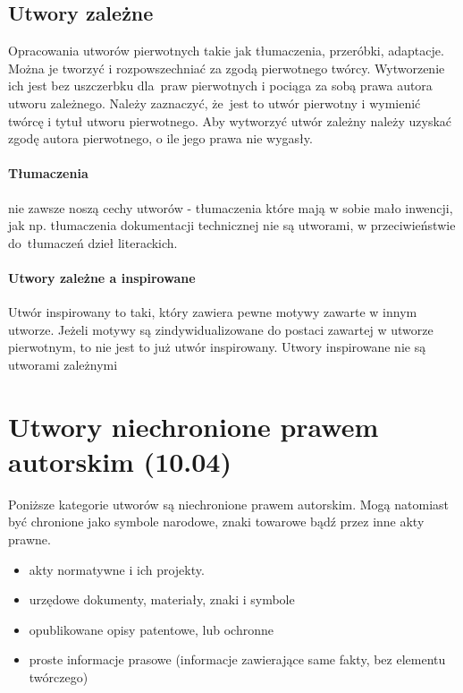 \documentclass{article}
\begin{document}
\subsection{Utwory zależne}

Opracowania utworów pierwotnych takie jak tłumaczenia, przeróbki, adaptacje.
Można je tworzyć i rozpowszechniać za zgodą pierwotnego twórcy.
Wytworzenie ich jest bez uszczerbku dla~praw pierwotnych i pociąga za sobą prawa autora utworu zależnego.
Należy zaznaczyć, że~jest to utwór pierwotny i wymienić twórcę i tytuł utworu pierwotnego.
Aby wytworzyć utwór zależny należy uzyskać zgodę autora pierwotnego, o ile jego prawa nie wygasły.

\paragraph{Tłumaczenia}

nie zawsze noszą cechy utworów - tłumaczenia które mają w sobie mało inwencji,
jak np. tłumaczenia dokumentacji technicznej nie są utworami, w przeciwieństwie do~tłumaczeń dzieł literackich.

\paragraph{Utwory zależne a inspirowane}

Utwór inspirowany to taki, który zawiera pewne motywy zawarte w innym utworze.
Jeżeli motywy są zindywidualizowane do postaci zawartej w utworze pierwotnym, to nie jest to już utwór inspirowany.
Utwory inspirowane nie są utworami zależnymi

\section{Utwory niechronione prawem autorskim (10.04)}

Poniższe kategorie utworów są niechronione prawem autorskim.
Mogą natomiast być chronione jako symbole narodowe, znaki towarowe bądź przez inne akty prawne.

\begin{itemize}
  \item akty normatywne i ich projekty.
  \item urzędowe dokumenty, materiały, znaki i symbole
  \item opublikowane opisy patentowe, lub ochronne
  \item proste informacje prasowe (informacje zawierające same fakty, bez elementu twórczego)
\end{itemize}
\end{document}
